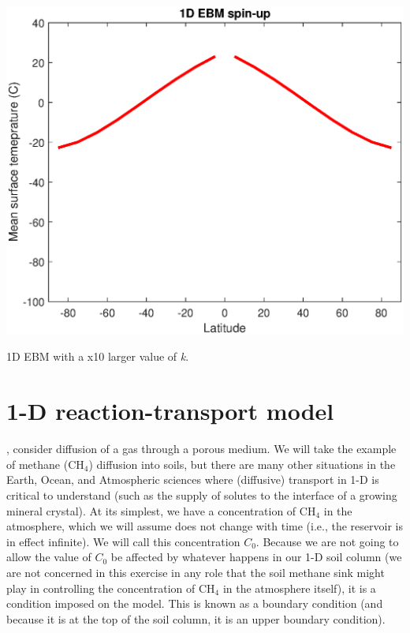 \documentclass{tufte-book} %
\begin{document}
\begin{marginfigure}[-0.0in]
\includegraphics[width=\linewidth]{ch4-ebm-1d-diff1p0.eps}
\caption{1D EBM with a x10 larger value of \textit{k}.}
\label{fig:ch4-ebm-1d-diff1p0}
\end{marginfigure}


\newpage


\section{1-D reaction-transport model}

, consider diffusion of a gas through a porous medium. We will take the example of methane (CH\(_{4}\)) diffusion into soils, but there are many other situations in the Earth, Ocean, and Atmospheric sciences where (diffusive) transport in 1-D is critical to understand (such as the supply of solutes to the interface of a growing mineral crystal). 
At its simplest, we have a concentration of CH\(_{4}\) in the atmosphere, which we will assume does not change with time (i.e., the reservoir is in effect infinite). We will call this concentration \(C_{0}\). Because we are not going to allow the value of \(C_{0}\) be affected by whatever happens in our 1-D soil column (we are not concerned in this exercise in any role that the soil methane sink might play in controlling the concentration of CH\(_{4}\) in the atmosphere itself), it is a condition imposed on the model. This is known as a boundary condition (and because it is at the top of the soil column, it is an upper boundary condition).
\end{document}
